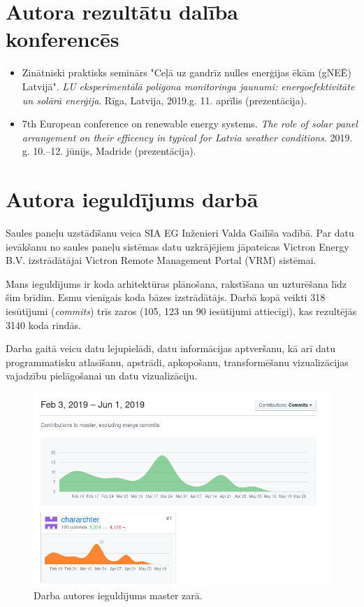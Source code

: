 \section{Autora rezultātu dalība konferencēs}
\begin{itemize}
\item Zinātniski praktisks seminārs "Ceļā uz gandrīz nulles enerģijas ēkām (gNEĒ) Latvijā". \emph{LU eksperimentālā poligona monitoringa jaunumi: energoefektivitāte un solārā enerģija}. Rīga, Latvija, 2019.g. 11. aprīlis (prezentācija).
\item 7th European conference on renewable energy systems. \emph{The role of solar panel arrangement on their efficency in typical for Latvia weather conditions}. 2019. g. 10.--12. jūnijs, Madride (prezentācija).
\end{itemize}

\section{Autora ieguldījums darbā}

Saules paneļu uzstādīšanu veica SIA EG Inženieri Valda Gailīša vadībā.
Par datu ievākšanu no saules paneļu sistēmas datu uzkrājējiem jāpateicas Victron Energy B.V. izstrādātājai Victron Remote Management Portal (VRM) sistēmai.

Mans ieguldījums ir koda arhitektūras plānošana, rakstīšana un uzturēšana līdz šim brīdim. Esmu vienīgais koda bāzes izstrādātājs. Darbā kopā veikti 318 iesūtījumi (\textit{commits}) trīs zaros (105, 123 un 90 iesūtījumi attiecīgi), kas rezultējās 3140 koda rindās. 

Darba gaitā veicu datu lejupielādi, datu informācijas aptveršanu, kā arī datu programmatisku atlasīšanu, apstrādi, apkopošanu, transformēšanu vizualizācijas vajadzību pielāgošanai un datu vizualizāciju. 

\begin{figure}[h]
	\centering
	\includegraphics[width=0.6\linewidth]{figures/misc/contributions.png}
	\caption{Darba autores ieguldījums master zarā.}
	\label{fig:retribution}
\end{figure}

